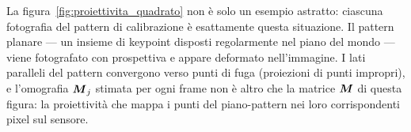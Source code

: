 \begin{oss}
La figura~\ref{fig:proiettivita_quadrato} non è solo un esempio astratto:
ciascuna fotografia del pattern di calibrazione è esattamente questa
situazione. Il pattern planare --- un insieme di keypoint disposti
regolarmente nel piano del mondo --- viene fotografato con prospettiva
e appare deformato nell'immagine. I lati paralleli del pattern
convergono verso punti di fuga (proiezioni di punti impropri), e
l'omografia \(\boldsymbol{M}_j\) stimata per ogni frame non è altro che la
matrice \(\boldsymbol{M}\) di questa figura: la proiettività che mappa i
punti del piano-pattern nei loro corrispondenti pixel sul sensore.
\end{oss}
